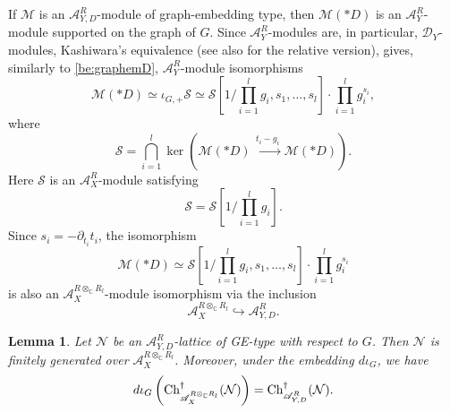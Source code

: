 \documentclass{amsart}
\theoremstyle{plain}
\numberwithin{theorem}{section}
\newtheorem{lemma}[theorem]{Lemma}
\theoremstyle{definition}
\theoremstyle{remark}
\theoremstyle{definition}
\newcommand{\C}{\mathbb{C}} %
\newcommand{\cM}{\mathcal{M}}
\newcommand{\cN}{\mathcal{N}}
\newcommand{\cS}{\mathcal{S}}
\newcommand{\sA}{\mathscr{A}}
\newcommand{\shD}{\mathscr{D}}
\newcommand{\Ch}{\textup{Ch}}
\begin{document}
If $\cM$ is an $\sA^R_{Y,D}$-module of graph-embedding type, then $\cM(*D)$ is
an $\sA_Y^R$-module supported on the graph of $G$. Since $\sA_Y^R$-modules are,
in particular, $\shD_Y$-modules, Kashiwara's equivalence
\cite[Thm.1.6.1]{HTT} (see also \cite[Thm.1.5]{FS17} for the relative
version), gives, similarly to \eqref{be:graphemD}, $\sA_Y^R$-module isomorphisms
\begin{equation}\label{eq:getypeD}
\cM(*D)
\simeq
\iota_{G,+}\cS
\simeq
\cS\left[1/\prod_{i=1}^l g_i,s_1,\dots,s_l\right]\cdot
\prod_{i=1}^l g_i^{s_i},
\end{equation}
where
\[
\cS
=
\bigcap_{i=1}^l
\ker\left(
\cM(*D)\xrightarrow{\,t_i-g_i\,}\cM(*D)
\right).
\]
Here $\cS$ is an $\sA_X^R$-module satisfying
\[
\cS=\cS\left[1/\prod_{i=1}^l g_i\right].
\]
Since $s_i=-\partial_{t_i}t_i$, the isomorphism
\[
\cM(*D)
\simeq
\cS\left[1/\prod_{i=1}^l g_i,s_1,\dots,s_l\right]\cdot
\prod_{i=1}^l g_i^{s_i}
\]
is also an $\sA_X^{R\otimes_\C R_l}$-module isomorphism via the inclusion
\[
\sA_X^{R\otimes_\C R_l}\hookrightarrow \sA^R_{Y,D}.
\]

\begin{lemma}\label{lm:GE-type}
Let $\cN$ be an $\sA^R_{Y,D}$-lattice of GE-type with respect to $G$.
Then $\cN$ is finitely generated over $\sA_X^{R\otimes_\C R_l}$. Moreover, under
the embedding $d\iota_G$, we have
\[
d\iota_G\left(
\Ch^\dagger_{\sA_X^{R\otimes_\C R_l}}(\cN)
\right)
=
\Ch^\dagger_{\sA^R_{Y,D}}(\cN).
\]
\end{lemma}
\end{document}
